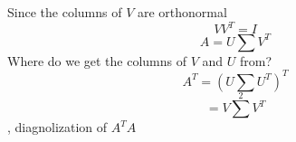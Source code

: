 \markdownRendererInterblockSeparator
{}Since the columns of $V$ are orthonormal\markdownRendererEllipsis{}\markdownRendererInterblockSeparator
{}$$VV^T=I$$\markdownRendererInterblockSeparator
{}$$A = U\sum V^T$$\markdownRendererInterblockSeparator
{}Where do we get the columns of $V$ and $U$ from?\markdownRendererInterblockSeparator
{}$$A^T = (U\sum U^T)^T$$\markdownRendererInterblockSeparator
{}$$=V\sum^2 V^T$$, diagnolization of $A^TA$\relax